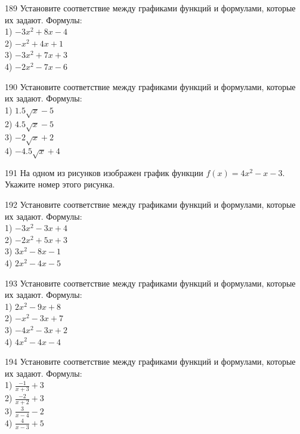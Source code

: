 \documentclass[4apaper]{article}
\begin{document}
\begin{taskBN}{189}
Установите соответствие между графиками функций и формулами, которые их задают. Формулы: \\1) $-3x^2+8x-4$\\2) $-x^2+4x+1$\\3) $-3x^2+7x+3$\\4) $-2x^2-7x-6$
\end{taskBN}

\begin{taskBN}{190}
Установите соответствие между графиками функций и формулами, которые их задают. Формулы: \\1) $1.5\sqrt{x}-5$\\2) $4.5\sqrt{x}-5$\\3) $-2\sqrt{x}+2$\\4) $-4.5\sqrt{x}+4$
\end{taskBN}

\begin{taskBN}{191}
На одном из рисунков изображен график функции $f(x)=4x^2-x-3$. Укажите номер этого рисунка.
\end{taskBN}

\begin{taskBN}{192}
Установите соответствие между графиками функций и формулами, которые их задают. Формулы: \\1) $-3x^2-3x+4$\\2) $-2x^2+5x+3$\\3) $3x^2-8x-1$\\4) $2x^2-4x-5$
\end{taskBN}

\begin{taskBN}{193}
Установите соответствие между графиками функций и формулами, которые их задают. Формулы: \\1) $2x^2-9x+8$\\2) $-x^2-3x+7$\\3) $-4x^2-3x+2$\\4) $4x^2-4x-4$
\end{taskBN}

\begin{taskBN}{194}
Установите соответствие между графиками функций и формулами, которые их задают. Формулы: \\1) $\frac{-1}{x+3}+3$\\2) $\frac{-2}{x+2}+3$\\3) $\frac{3}{x-4}-2$\\4) $\frac{4}{x-3}+5$
\end{taskBN}
\end{document}
